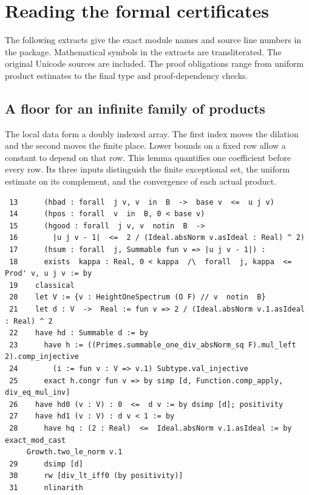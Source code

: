 \documentclass[12pt,letterpaper]{article}
\begin{document}
\section{Reading the formal certificates} The following extracts give the exact module names and source line numbers in the package. Mathematical symbols in the extracts are transliterated. The original Unicode sources are included. The proof obligations range from uniform product estimates to the final type and proof-dependency checks.
\smallskip{}\subsection*{A floor for an infinite family of products}\label{extract-ProgressionGrowth13}
The local data form a doubly indexed array. The first index moves the dilation and the second moves the finite place. Lower bounds on a fixed row allow a constant to depend on that row. This lemma quantifies one coefficient before every row. Its three inputs distinguish the finite exceptional set, the uniform estimate on its complement, and the convergence of each actual product.
\par
{\fontsize{9.2}{11.2}\selectfont\begin{verbatim}
 13      (hbad : forall  j v, v  in  B  ->  base v  <=  u j v)
 14      (hpos : forall  v  in  B, 0 < base v)
 15      (hgood : forall  j v, v  notin  B  ->
 16        |u j v - 1|  <=  2 / (Ideal.absNorm v.asIdeal : Real) ^ 2)
 17      (hsum : forall  j, Summable fun v => |u j v - 1|) :
 18      exists  kappa : Real, 0 < kappa  /\  forall  j, kappa  <=  Prod' v, u j v := by
 19    classical
 20    let V := {v : HeightOneSpectrum (O F) // v  notin  B}
 21    let d : V  ->  Real := fun v => 2 / (Ideal.absNorm v.1.asIdeal : Real) ^ 2
 22    have hd : Summable d := by
 23      have h := ((Primes.summable_one_div_absNorm_sq F).mul_left 2).comp_injective
 24        (i := fun v : V => v.1) Subtype.val_injective
 25      exact h.congr fun v => by simp [d, Function.comp_apply, div_eq_mul_inv]
 26    have hd0 (v : V) : 0  <=  d v := by dsimp [d]; positivity
 27    have hd1 (v : V) : d v < 1 := by
 28      have hq : (2 : Real)  <=  Ideal.absNorm v.1.asIdeal := by exact_mod_cast
     Growth.two_le_norm v.1
 29      dsimp [d]
 30      rw [div_lt_iff0 (by positivity)]
 31      nlinarith
\end{verbatim}}
\end{document}
